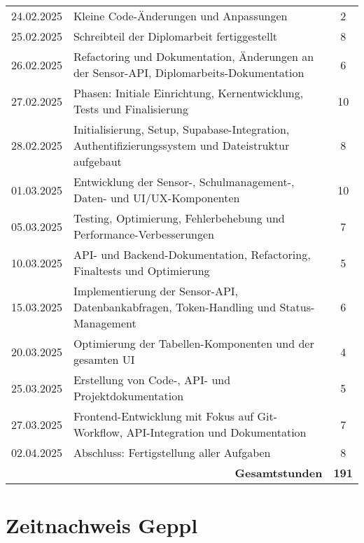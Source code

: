 \begin{longtable}{|l|p{9cm}|c|}
    24.02.2025 & Kleine Code-Änderungen und Anpassungen & 2 \\
    25.02.2025 & Schreibteil der Diplomarbeit fertiggestellt & 8 \\
    26.02.2025 & Refactoring und Dokumentation, Änderungen an der Sensor-API, Diplomarbeits-Dokumentation & 6 \\
    27.02.2025 & Phasen: Initiale Einrichtung, Kernentwicklung, Tests und Finalisierung & 10 \\
    28.02.2025 & Initialisierung, Setup, Supabase-Integration, Authentifizierungssystem und Dateistruktur aufgebaut & 8 \\
    01.03.2025 & Entwicklung der Sensor-, Schulmanagement-, Daten- und UI/UX-Komponenten & 10 \\
    05.03.2025 & Testing, Optimierung, Fehlerbehebung und Performance-Verbesserungen & 7 \\
    10.03.2025 & API- und Backend-Dokumentation, Refactoring, Finaltests und Optimierung & 5 \\
    15.03.2025 & Implementierung der Sensor-API, Datenbankabfragen, Token-Handling und Status-Management & 6 \\
    20.03.2025 & Optimierung der Tabellen-Komponenten und der gesamten UI & 4 \\
    25.03.2025 & Erstellung von Code-, API- und Projektdokumentation & 5 \\
    27.03.2025 & Frontend-Entwicklung mit Fokus auf Git-Workflow, API-Integration und Dokumentation & 7 \\
    02.04.2025 & Abschluss: Fertigstellung aller Aufgaben & 8 \\
    \hline
    \multicolumn{2}{|r|}{\textbf{Gesamtstunden}} & \textbf{191} \\
    \hline
\end{longtable}

\section{Zeitnachweis Geppl}

\renewcommand{\arraystretch}{1.8}

